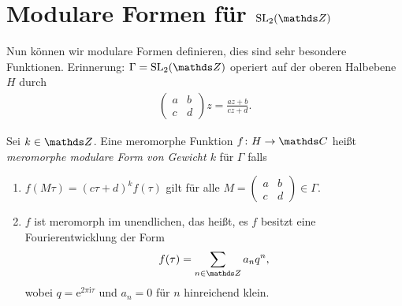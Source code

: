 \chapter{Modulare Formen für $\SL_2(\Z)$}

Nun können wir modulare Formen definieren, dies sind sehr besondere Funktionen.
Erinnerung: $\Gamma=\SL_2(\Z)$ operiert auf der oberen Halbebene $H$ durch
\begin{align*}
\begin{pmatrix}
a&b\\
c&d
\end{pmatrix} z=\frac{az+b}{cz+d}.
\end{align*}

\begin{defi}
Sei $k \in \Z$. Eine meromorphe Funktion $f \colon H \to \C$ heißt
\emph{meromorphe modulare Form von Gewicht $k$} für $\Gamma$ falls
\begin{enumerate}[label=\arabic*)]
\item $f(M \tau)=(c\tau +d)^k f(\tau)$ gilt für alle $M =\begin{pmatrix}
a&b\\
c&d
\end{pmatrix} \in \Gamma$.
\item $f$ ist meromorph im unendlichen, das heißt, es $f$ besitzt
eine Fourierentwicklung der Form
\begin{align*}
f(\tau)=\sum_{n \in \Z} a_n q^n,
\end{align*}
wobei $q=\mathrm{e}^{2\pi \mathrm{i} \tau}$ und $a_n=0$ für $n$ hinreichend klein.
\end{enumerate}
\end{defi}

